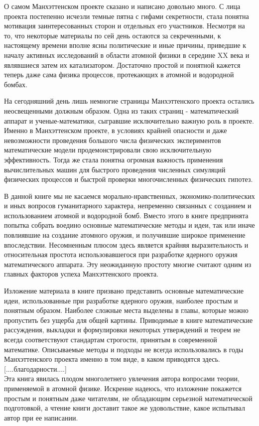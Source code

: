 О самом Манхэттенском проекте сказано и написано довольно много.
С лица проекта постепенно исчезли темные пятна с гифами секретности, стала понятна мотивация заинтересованных сторон и отдельных его участников.
Несмотря на то, что некоторые материалы по сей день остаются за секреченными, к настоящему времени вполне ясны политические и иные причины, приведшие к началу активных исследований в области атомной физики в середине XX века и являвшиеся затем их катализатором.
Достаточно простой и понятной кажется теперь даже сама физика процессов, протекающих в атомной и водородной бомбах.

На сегодняшний день лишь немногие страницы Манхэттенского проекта остались неосвещенными должным образом. 
Одна из таких страниц - математический аппарат и ученые-математики, сыгравшие исключительно важную роль в проекте.
Именно в Манхэттенском проекте, в условиях крайней опасности и даже невозможности проведения большого числа физических экспериментов математические модели продемонстрировали свою исключительную эффективность.
Тогда же стала понятна огромная важность применения вычислительных машин для быстрого проведения численных симуляций физических процессов и быстрой проверки многочисленных физических гипотез.

В данной книге мы не касаемся морально-нравственных, экономико-политических и иных вопросов гуманитарного характера, непременно связанных с созданием и использованием атомной и водородной бомб.
Вместо этого в книге предпринята попытка собрать воедино основные математические методы и идеи, так или иначе повлиявшие на создание атомного оружия, и получившие широкое применение впоследствии.
Несомненным плюсом здесь является крайняя выразительность и относительная простота использовавшегося при разработке ядерного оружия математического аппарата. 
Эту неожиданную простоту многие считают одним из главных факторов успеха Манхэттенского проекта.

Изложение материала в книге призвано представить основные математические идеи, использованные при разработке ядерного оружия, наиболее простым и понятным образом. 
Наиболее сложные места выделены в главы, которые можно пропустить без ущерба для общей картины.
Приводимые в книге математические рассуждения, выкладки и формулировки некоторых утверждений и теорем не всегда соответствуют стандартам строгости, принятым в современной математике.
Описываемые методы и подходы не всегда использовались в годы Манхэттенского проекта именно в том виде, в каком приводятся здесь.
\\

[....благодарности....]
\\

Эта книга явилась плодом многолетнего увлечения автора вопросами теории, применяемой в атомной физике. 
Искренне надеюсь, что изложение покажется простым и понятным даже читателям, не обладающим серьезной математической подготовкой, а чтение книги доставит такое же удовольствие, какое испытывал автор при ее написании.

